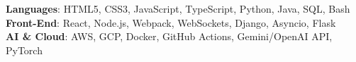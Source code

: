 \begin{itemize}[leftmargin=0.15in, label={}]
    \small{\item{
     \textbf{Languages}{: HTML5, CSS3, JavaScript, TypeScript, Python, Java, SQL, Bash} \\
     \textbf{Front-End}{: React, Node.js, Webpack, WebSockets, Django, Asyncio, Flask} \\
     \textbf{AI \& Cloud}{: AWS, GCP, Docker, GitHub Actions, Gemini/OpenAI API, PyTorch}
    }}
\end{itemize}
